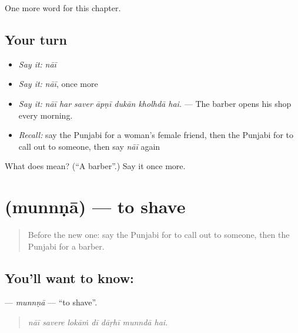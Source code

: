 \begin{grammarlens}[title={What you've built}]
One more word for this chapter.
\end{grammarlens}

\subsection*{Your turn}
\begin{itemize}
\raggedright
  \item \emph{Say it:} \emph{nāī}
  \item \emph{Say it:} \emph{nāī}, once more
  \item \emph{Say it:} \emph{nāī har saver āpṇī dukān kholhdā hai.} — The barber opens his shop every morning.
  \item \emph{Recall:} say the Punjabi for a woman's female friend, then the Punjabi for to call out to someone, then say \emph{nāī} again
\end{itemize}

\begin{tcolorbox}[breakable,colback=teal!4,colframe=teal!35!black,title={Before you move on}]
What does  mean? (\textquotedblleft{}A barber\textquotedblright{}.) Say it once more.
\end{tcolorbox}
\section[\texorpdfstring{\pa{ਮੁੰਨਣਾ} (munnṇā)}{ਮੁੰਨਣਾ (munnṇā)}]{ (munnṇā) — to shave}

\label{lesson:PA-C333-munnna}



\begin{quote}
Before the new one: say the Punjabi for to call out to someone, then the Punjabi for a barber.
\end{quote}

\subsection*{You'll want to know: }
\textbf{} — \emph{munnṇā} — \textquotedblleft{}to shave\textquotedblright{}.

\begin{quote}
      
\end{quote}

\begin{quote}
\emph{nāī savere lokāṁ dī dāṛhī munndā hai.}
\end{quote}

